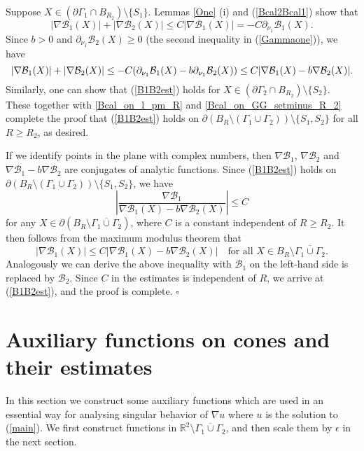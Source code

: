 \documentclass[11pt,a4paper]{article}
\numberwithin{equation}{section}
\newcommand{\qed}{\hfill \ensuremath{\square}}
\newcommand{\p}{\partial}
\newcommand{\eqnref}[1]{(\ref {#1})}
\newcommand{\Rbb}{\mathbb{R}}
\newcommand{\Bcal}{\mathcal{B}}
\newcommand{\Ge}{\epsilon}
\newcommand{\GG}{\Gamma}
\newcommand{\beq}{\begin{equation}}
\newcommand{\eeq}{\end{equation}}
\begin{document}
Suppose $X \in ( \p \GG_1 \cap B_{R_2} ) \setminus \{S_1 \}$. Lemmas \ref{One} (i) and \eqnref{Bcal2Bcal1} show that
$$
|\nabla \Bcal_1 (X)| + | \nabla \Bcal_2 (X)| \leq  C |\nabla \Bcal_1 (X)| =  -  C \p_{\nu_1} \Bcal_1 (X).
$$
Since $b>0$ and $\p_{\nu_1} \Bcal_2\left ( X\right) \ge 0$ (the second inequality in \eqnref{Gammaone}), we have
\beq
|\nabla \Bcal_1 (X)| + | \nabla \Bcal_2 (X)| \leq - C ( \p_{\nu_1} \Bcal_1 (X) - b  \p_{\nu_1} \Bcal_2 (X)) \le C |\nabla \Bcal_1 (X) - b  \nabla \Bcal_2 (X)|. \notag
\eeq
Similarly, one can show that \eqnref{B1B2est} holds for $X \in ( \p \GG_2 \cap B_{R_2} ) \setminus \{S_2 \}$. These together with \eqref{Bcal_on_l_pm_R} and \eqref{Bcal_on_GG_setminus_R_2} complete the proof that \eqnref{B1B2est} holds on $\p \left( B_R \setminus (\GG_1 \cup \GG_2) \right) \setminus \{ S_1, S_2 \}$ for all $R \ge R_2$, as desired.



If we identify points in the plane with complex numbers, then $\nabla \Bcal_1 $, $\nabla \Bcal_2$ and $\nabla\Bcal_1 - b  \nabla\Bcal_2$ are conjugates of analytic functions. Since \eqnref{B1B2est} holds on $\p \left( B_R \setminus (\GG_1 \cup \GG_2) \right) \setminus \{ S_1, S_2 \}$, we have
$$
\left | \frac {\nabla \Bcal_1} {\nabla  {\Bcal_1 (X)}- b  \nabla { \Bcal_2  (X)}} \right| \leq C
$$
for any $X \in \p \left( B_R \setminus \overline{\GG_1 \cup \GG_2}\right) $, where $C$ is a constant independent of $R \ge R_2$. It then follows from the maximum modulus theorem that
$$
\left | \nabla \Bcal_1 (X)  \right| \leq C \left|{\nabla  {\Bcal_1 (X)}- b  \nabla { \Bcal_2  (X)}}\right| \quad\mbox{for all } X \in B_R \setminus \overline{\GG_1 \cup \GG_2}.
$$
Analogously we can derive the above inequality with $\Bcal_1$ on the left-hand side is replaced by $\Bcal_2$. Since $C$ in the estimates is independent of $R$, we arrive at \eqnref{B1B2est}, and the proof is complete. \qed


\section{Auxiliary functions on cones and their estimates}\label{sec:cone}



In this section we construct some auxiliary functions which are used in an essential way for analysing singular behavior of $\nabla u$ where $u$ is the solution to \eqnref{main}. We first construct functions in $\Rbb^2 \setminus \overline {\GG_1 \cup \GG_2}$, and then scale them by $\Ge$ in the next section.
\end{document}
